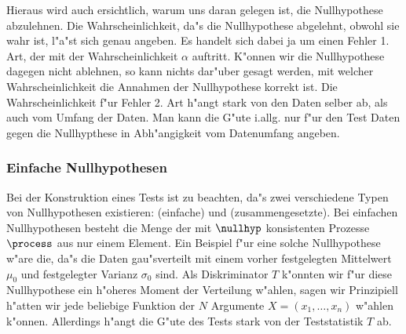 Hieraus wird auch ersichtlich, warum uns daran gelegen ist, die Nullhypothese abzulehnen.
Die Wahrscheinlichkeit, da"s die Nullhypothese abgelehnt, obwohl sie wahr ist, l"a"st sich
genau angeben. Es handelt sich dabei ja um einen Fehler 1. Art, der mit der
Wahrscheinlichkeit $\alpha$ auftritt. K"onnen wir die Nullhypothese dagegen nicht
ablehnen, so kann nichts dar"uber gesagt werden, mit welcher Wahrscheinlichkeit die
Annahmen der Nullhypothese korrekt ist. Die Wahrscheinlichkeit f"ur Fehler 2. Art h"angt
stark von den Daten selber ab, als auch vom Umfang der Daten. Man kann die G"ute i.allg.
nur f"ur den Test  Daten gegen die Nullhypthese in Abh"angigkeit vom
Datenumfang angeben.


\subsubsection{Einfache Nullhypothesen}
Bei der Konstruktion eines Tests ist zu beachten, da"s zwei verschiedene Typen von
Nullhypothesen existieren: \begriff(einfache) und \begriff(zusammengesetzte). Bei
einfachen Nullhypothesen besteht die Menge der mit $\nullhyp$ konsistenten Prozesse
$\process$ aus nur einem Element. Ein Beispiel f"ur eine solche Nullhypothese w"are die,
da"s die Daten gau"sverteilt mit einem vorher festgelegten Mittelwert $\mu_0$ und
festgelegter Varianz $\sigma_0$ sind. Als Diskriminator $T$ k"onnten wir f"ur diese
Nullhypothese ein h"oheres Moment der Verteilung w"ahlen, sagen wir
Prinzipiell h"atten wir jede beliebige
Funktion der $N$ Argumente $X=(x_1,\dots,x_n) $ w"ahlen k"onnen. Allerdings h"angt die
G"ute des Tests stark von der Teststatistik $T$ ab\footnotemark.  


